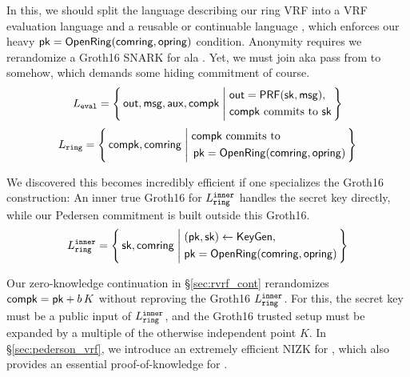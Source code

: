 In this, we should split the language describing our ring VRF into
a VRF evaluation language \Leval and a reusable or continuable language
\Lring, which enforces our heavy $\mathsf{pk} = {\mathsf{OpenRing}}(\mathsf{comring},\mathsf{opring})$
condition.  Anonymity requires we rerandomize a Groth16 SNARK for \Lring
ala \cite[Theorem 3, Appendix C, pp. 31]{RandomizationGroth16}.
%
Yet, we must join aka pass \pk from \Lring to \Leval somehow, which
demands some hiding commitment \compk of course.
%
\def\tmpAA{\Out = \PRF(\sk,\msg)}%
\def\tmpBB{\textrm{\compk commits to\ \sk}}%
$$ \Leval = \Setst{ \Out, \msg, \aux, \compk }{
	\eprint{
	\tmpAA, \, \tmpBB
    }{
	\begin{aligned}
	&\tmpAA, \\
	&\tmpBB \\
	\end{aligned}
    }
} $$
\def\tmpAA{\textrm{\compk commits to\ }}%
\def\tmpBB{\OpenRing(\comring,\openring)}%
$$ \Lring = \Setst{ \compk, \comring }{
	\eprint{
	\tmpAA \pk = \tmpBB
	}{
    \begin{aligned}
	&\tmpAA \\
	&\, \pk = \tmpBB \\
    \end{aligned}
	}
} $$

We discovered this becomes incredibly efficient if one specializes
the Groth16 construction:  An inner true Groth16 for $L_{\mathtt{ring}}^{\mathtt{inner}}$ handles
the secret key \sk directly, while our Pedersen commitment \compk is
built outside this Groth16.  
$$ \Lring^\inner = \Setst{ \sk, \comring}{
    \eprint{
    (\pk,\sk) \leftarrow \KeyGen, \, %
    \pk = \OpenRing(\comring,\openring) 
    }{
    \begin{aligned}
        &(\pk,\sk) \leftarrow \KeyGen, \\
        &\pk = \OpenRing(\comring,\openring)  \\      
    \end{aligned}
    }
} $$

Our zero-knowledge continuation in \S\ref{sec:rvrf_cont} rerandomizes
$\mathsf{compk} = \mathsf{pk} + b \, K$ without reproving the Groth16 $L_{\mathtt{ring}}^{\mathtt{inner}}$.
For this, the secret key \sk must be a public input of $L_{\mathtt{ring}}^{\mathtt{inner}}$, and
the Groth16 trusted setup must be expanded by a multiple of
 the otherwise independent point $K$.
%
In \S\ref{sec:pederson_vrf}, we introduce an extremely efficient NIZK
for \Leval, which also provides an essential proof-of-knowledge for \compk.


\endinput





Ring VRFs are firstly ring signatures broadly interpreted, in that they
prove an involved public key lies inside some commitment \comring to
the plausible signer set, known as the ring.
Anyone could compute \comring from this set of public keys.
%
At the same time, ring VRFs prove correct output of a PRF keyed by
the signer's actual secret key, and evaluated on a supplied message \msg,
which then links ring VRF signatures on the same \msg.

\smallskip
